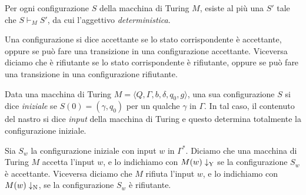 \begin{osservazione}
 Per ogni configurazione $S$ della macchina di Turing $M$, esiste al più una
 $S'$ tale che $S \vdash_M S'$, da cui l'aggettivo \emph{deterministica}.
\end{osservazione}


\begin{definizione}
 Una configurazione si dice accettante se lo stato corrispondente è accettante,
 oppure se può fare una transizione in una configurazione accettante.
 Viceversa diciamo che è rifiutante se lo stato corrispondente è rifiutante,
 oppure se può fare una transizione in una configurazione rifiutante.
\end{definizione}

\begin{definizione}
 Data una macchina di Turing $M=\langle Q, \Gamma, b, \delta, q_0, g \rangle$, 
 una sua configurazione $S$ si dice \emph{iniziale} se
 $S(0) = (\gamma, q_0)$ per un qualche $\gamma$ in $\Gamma$. In tal caso, il contenuto del nastro
 si dice \emph{input} della macchina di Turing e questo determina totalmente
 la configurazione iniziale.
\end{definizione}

\begin{definizione}
\label{def:accept-input}
 Sia $S_w$ la configurazione iniziale con input $w$ in $\Gamma^\ast$. Diciamo che
 una macchina di Turing $M$ accetta l'input $w$, e lo indichiamo con $M(w)\downarrow_{\text{Y}}$
 se la configurazione $S_w$ è accettante. Viceversa diciamo che $M$
 rifiuta l'input $w$, e lo indichiamo con $M(w)\downarrow_{\text{N}}$, se
 la configurazione $S_w$ è rifiutante.
 
\end{definizione}

